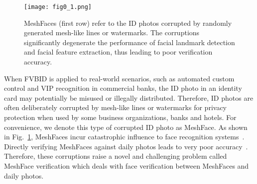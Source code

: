 \documentclass[10pt,twocolumn,letterpaper]{article}
\begin{document}
\begin{figure}
  \centering
    \texttt{[image: fig0\_1.png]}
    \caption{MeshFaces (first row) refer to the ID photos corrupted by randomly generated mesh-like lines or watermarks. The corruptions significantly degenerate the performance of facial landmark detection and facial feature extraction, thus leading to poor verification accuracy.}
    \label{fig:spn} %
\end{figure}



When FVBID is applied to real-world scenarios, such as automated custom control and VIP recognition in commercial banks, the ID photo in an identity card may potentially be misused or illegally distributed. Therefore, ID photos are often deliberately corrupted by mesh-like lines or watermarks for privacy protection when used by some business organizations, \eg banks and hotels. For convenience, we denote this type of corrupted ID photo as MeshFace. As shown in Fig.~\ref{fig:spn}, MeshFaces incur catastrophic influence to face recognition systems~\cite{Burgos-Artizzu_2013_ICCV,he}. Directly verifying MeshFaces against daily photos leads to very poor accuracy~\cite{7550058}. Therefore, these corruptions raise a novel and challenging problem called MeshFace verification which deals with face verification between MeshFaces and daily photos.
\end{document}
